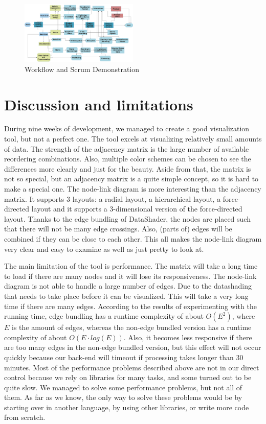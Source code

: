 \documentclass[journal]{vgtc}                %
\begin{document}
\begin{figure}[hbt]
    \centering
    \includegraphics[width=0.5\textwidth]{Workflow.png}
    \caption{Workflow and Scrum Demonstration}
    \label{fig:workflow}
\end{figure}

\section{Discussion and limitations} \label{sect:discussion} %
During nine weeks of development, we managed to create a good visualization tool, but not a perfect one.
The tool excels at visualizing relatively small amounts of data. The strength of the adjacency matrix is the large number of available reordering combinations. Also, multiple color schemes can be chosen to see the differences more clearly and just for the beauty. Aside from that, the matrix is not so special, but an adjacency matrix is a quite simple concept, so it is hard to make a special one.
The node-link diagram is more interesting than the adjacency matrix. It supports 3 layouts: a radial layout, a hierarchical layout, a force-directed layout and it supports a 3-dimensional version of the force-directed layout. Thanks to the edge bundling of DataShader, the nodes are placed such that there will not be many edge crossings. Also, (parts of) edges will be combined if they can be close to each other. This all makes the node-link diagram very clear and easy to examine as well as just pretty to look at.

The main limitation of the tool is performance. The matrix will take a long time to load if there are many nodes and it will lose its responsiveness.
The node-link diagram is not able to handle a large number of edges. Due to the datashading that needs to take place before it can be visualized. This will take a very long time if there are many edges. According to the results of experimenting with the running time, edge bundling has a runtime complexity of about $O(E^2)$, where $E$ is the amount of edges, whereas the non-edge bundled version has a runtime complexity of about $O(E \cdot log(E))$. Also, it becomes less responsive if there are too many edges in the non-edge bundled version, but this effect will not occur quickly because our back-end will timeout if processing takes longer than 30 minutes.
Most of the performance problems described above are not in our direct control because we rely on libraries for many tasks, and some turned out to be quite slow. We managed to solve some performance problems, but not all of them.
As far as we know, the only way to solve these problems would be by starting over in another language, by using other libraries, or write more code from scratch.
\end{document}
